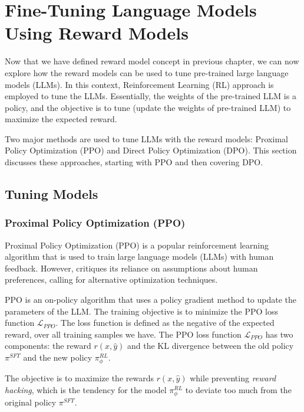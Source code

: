 \section{Fine-Tuning Language Models Using Reward Models}
\label{sec:tunning-lllm.tex}

Now that we have defined reward model concept in previous chapter, we can now explore how the  reward models can be used to tune pre-trained large language models (LLMs). In this context, Reinforcement Learning (RL) approach is employed to tune the LLMs. Essentially, the weights of the pre-trained LLM is a policy, and the objective is to tune (update the weights of pre-trained LLM) to maximize the expected reward.

Two major methods are used to tune LLMs with  the reward models: 
Proximal Policy Optimization (PPO) \cite{schulmanProximalPolicyOptimization2017} and Direct 
Policy Optimization (DPO). This section discusses these approaches, starting with PPO and then covering DPO.


\subsection{Tuning Models} \label{subsec:tunning-models}


\subsubsection{Proximal Policy Optimization (PPO)} \label{subsubsec:ppo}

Proximal Policy Optimization (PPO) is a popular reinforcement learning 
algorithm that is used to train large language models (LLMs) with human feedback. 
However, \cite{lambertReinforcementLearningHumana} critiques its reliance on assumptions about human preferences, calling for alternative optimization techniques.

PPO is an on-policy algorithm that uses a policy gradient method to update the parameters of the LLM. The training objective is to minimize the PPO loss function $\mathcal{L}_{PPO}$. The loss function is defined as the negative of the expected reward, over all training samples we have. The PPO loss function $\mathcal{L}_{PPO}$ has two components: the reward $r(x, \hat{y})$ and the KL divergence between the old policy $\pi^{SFT}$ and the new policy $\pi^{RL}_{\phi}$.

The objective is to maximize the rewards $r(x, \hat{y})$ while preventing \textit{reward hacking}, which is the tendency for the model $\pi^{RL}_{\phi}$ to deviate too much from the original policy 
$\pi^{SFT}$. \\ 


